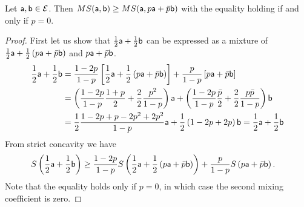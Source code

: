 \begin{prop}
	Let $\ens[a], \ens[b] \in \Ens$. Then $MS(\ens[a], \ens[b]) \geq MS(\ens[a], p\ens[a]+\bar{p}\ens[b])$ with the equality holding if and only if $p=0$.
\end{prop}

\begin{proof}
	First let us show that $\frac{1}{2} \ens[a] + \frac{1}{2} \ens[b]$ can be expressed as a mixture of $\frac{1}{2} \ens[a] + \frac{1}{2}\left(p\ens[a] + \bar{p} \ens[b]\right)$ and $p\ens[a] + \bar{p} \ens[b]$.
	\begin{equation}
		\begin{aligned}
			\frac{1}{2} \ens[a] + \frac{1}{2} \ens[b] &=  \frac{1-2p}{1-p}\left[\frac{1}{2} \ens[a] + \frac{1}{2}\left(p\ens[a] + \bar{p} \ens[b]\right)\right] + \frac{p}{1-p}\left[p\ens[a] + \bar{p} \ens[b]\right] \\
			&= \left( \frac{1-2p}{1-p} \frac{1+p}{2} + \frac{2}{2} \frac{p^2}{1-p} \right) \ens[a] + \left( \frac{1-2p}{1-p} \frac{\bar{p}}{2}+ \frac{2}{2} \frac{p\bar{p}}{1-p} \right) \ens[b] \\
			&= \frac{1}{2} \frac{1-2p + p - 2p^2 + 2p^2}{1-p} \ens[a] + \frac{1}{2}\left(1-2p+2p\right) \ens[b] = \frac{1}{2} \ens[a] + \frac{1}{2} \ens[b]
		\end{aligned}
	\end{equation}
	From strict concavity we have
	\begin{equation}
	\begin{aligned}
		S\left(\frac{1}{2} \ens[a] + \frac{1}{2} \ens[b] \right) &\geq  \frac{1-2p}{1-p}S\left(\frac{1}{2} \ens[a] + \frac{1}{2}\left(p\ens[a] + \bar{p} \ens[b]\right)\right) + \frac{p}{1-p} S\left(p\ens[a] + \bar{p} \ens[b]\right).
	\end{aligned}
\end{equation}
	Note that the equality holds only if $p=0$, in which case the second mixing coefficient is zero.
	

\end{proof}
